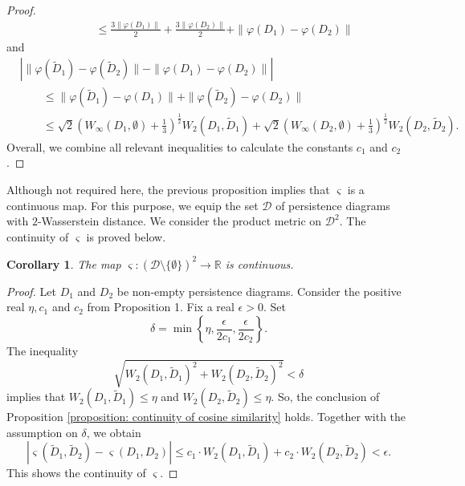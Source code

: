 \documentclass[sn-mathphys-num]{sn-jnl}%
\theoremstyle{thmstyleone}%
\newtheorem{corollary}[theorem]{Corollary}
\theoremstyle{thmstyletwo}%
\theoremstyle{thmstylethree}%
\begin{document}
\begin{proof}
\begin{align*}
		& \qquad \leq \frac{3\left\|\varphi(D_1)\right\|}{2}+\frac{3\left\|\varphi(D_2)\right\|}{2}+\|\varphi(D_1)-\varphi(D_2)\|
	\end{align*}
	and
	\begin{align*}
		& \left|\|\varphi(\tilde{D}_1)-\varphi(\tilde{D}_2)\|-\|\varphi(D_1)-\varphi(D_2)\|\right| \\
		& \qquad \leq \|\varphi(\tilde{D}_1)-\varphi(D_1)\|+\|\varphi(\tilde{D}_2)-\varphi(D_2)\| \\
		& \qquad \leq \sqrt{2}\left(W_{\infty}(D_1, \emptyset)+\frac{1}{3}\right)^{\frac{1}{2}} W_2(D_1, \tilde{D}_1)+\sqrt{2}\left(W_{\infty}(D_2, \emptyset)+\frac{1}{3}\right)^{\frac{1}{2}} W_2(D_2, \tilde{D}_2).
	\end{align*}
	Overall, we combine all relevant inequalities to calculate the constants $c_1$ and $c_2$.
\end{proof}

Although not required here, the previous proposition implies that $\varsigma$ is a continuous map. For this purpose, we equip the set $\mathcal{D}$ of persistence diagrams with $2$-Wasserstein distance. We consider the product metric on $\mathcal{D}^2$. The continuity of $\varsigma$ is proved below.

\begin{corollary}
	The map $\varsigma:\left(\mathcal{D} \setminus \{\emptyset\}\right)^2 \rightarrow \mathbb{R}$ is continuous.
\end{corollary}
\begin{proof}
	Let $D_1$ and $D_2$ be non-empty persistence diagrams. Consider the positive real $\eta, c_1$ and $c_2$ from Proposition 1. Fix a real $\epsilon>0$. Set
	\begin{equation*}
		\delta=\min \left\{\eta, \frac{\epsilon}{2 c_1}, \frac{\epsilon}{2 c_2}\right\}.
	\end{equation*}
	The inequality
	\begin{equation*}
		\sqrt{{W_2(D_1, \tilde{D}_1)}^2+{W_2(D_2, \tilde{D}_2)}^2}<\delta
	\end{equation*}
	implies that $W_2(D_1, \tilde{D}_1) \leq \eta$ and $W_2(D_2, \tilde{D}_2) \leq \eta$. So, the conclusion of Proposition \ref{proposition: continuity of cosine similarity} holds. Together with the assumption on $\delta$, we obtain
	\begin{equation*}
		|\varsigma(\tilde{D}_1, \tilde{D}_2)-\varsigma(D_1, D_2)| \leq c_1 \cdot W_2(D_1, \tilde{D}_1)+c_2 \cdot W_2(D_2, \tilde{D}_2)<\epsilon.
	\end{equation*}
	This shows the continuity of $\varsigma$.
\end{proof}
\end{document}
